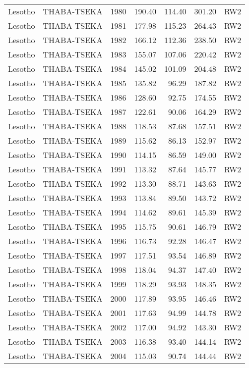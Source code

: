 \begin{longtable}{lllrrrl}
  Lesotho & THABA-TSEKA & 1980 & 190.40 & 114.40 & 301.20 & RW2 \\ 
  Lesotho & THABA-TSEKA & 1981 & 177.98 & 115.23 & 264.43 & RW2 \\ 
  Lesotho & THABA-TSEKA & 1982 & 166.12 & 112.36 & 238.50 & RW2 \\ 
  Lesotho & THABA-TSEKA & 1983 & 155.07 & 107.06 & 220.42 & RW2 \\ 
  Lesotho & THABA-TSEKA & 1984 & 145.02 & 101.09 & 204.48 & RW2 \\ 
  Lesotho & THABA-TSEKA & 1985 & 135.82 & 96.29 & 187.82 & RW2 \\ 
  Lesotho & THABA-TSEKA & 1986 & 128.60 & 92.75 & 174.55 & RW2 \\ 
  Lesotho & THABA-TSEKA & 1987 & 122.61 & 90.06 & 164.29 & RW2 \\ 
  Lesotho & THABA-TSEKA & 1988 & 118.53 & 87.68 & 157.51 & RW2 \\ 
  Lesotho & THABA-TSEKA & 1989 & 115.62 & 86.13 & 152.97 & RW2 \\ 
  Lesotho & THABA-TSEKA & 1990 & 114.15 & 86.59 & 149.00 & RW2 \\ 
  Lesotho & THABA-TSEKA & 1991 & 113.32 & 87.64 & 145.77 & RW2 \\ 
  Lesotho & THABA-TSEKA & 1992 & 113.30 & 88.71 & 143.63 & RW2 \\ 
  Lesotho & THABA-TSEKA & 1993 & 113.84 & 89.50 & 143.72 & RW2 \\ 
  Lesotho & THABA-TSEKA & 1994 & 114.62 & 89.61 & 145.39 & RW2 \\ 
  Lesotho & THABA-TSEKA & 1995 & 115.75 & 90.61 & 146.79 & RW2 \\ 
  Lesotho & THABA-TSEKA & 1996 & 116.73 & 92.28 & 146.47 & RW2 \\ 
  Lesotho & THABA-TSEKA & 1997 & 117.51 & 93.54 & 146.89 & RW2 \\ 
  Lesotho & THABA-TSEKA & 1998 & 118.04 & 94.37 & 147.40 & RW2 \\ 
  Lesotho & THABA-TSEKA & 1999 & 118.29 & 93.93 & 148.35 & RW2 \\ 
  Lesotho & THABA-TSEKA & 2000 & 117.89 & 93.95 & 146.46 & RW2 \\ 
  Lesotho & THABA-TSEKA & 2001 & 117.63 & 94.99 & 144.78 & RW2 \\ 
  Lesotho & THABA-TSEKA & 2002 & 117.00 & 94.92 & 143.30 & RW2 \\ 
  Lesotho & THABA-TSEKA & 2003 & 116.38 & 93.40 & 144.14 & RW2 \\ 
  Lesotho & THABA-TSEKA & 2004 & 115.03 & 90.74 & 144.44 & RW2 \\ 

\end{longtable}
